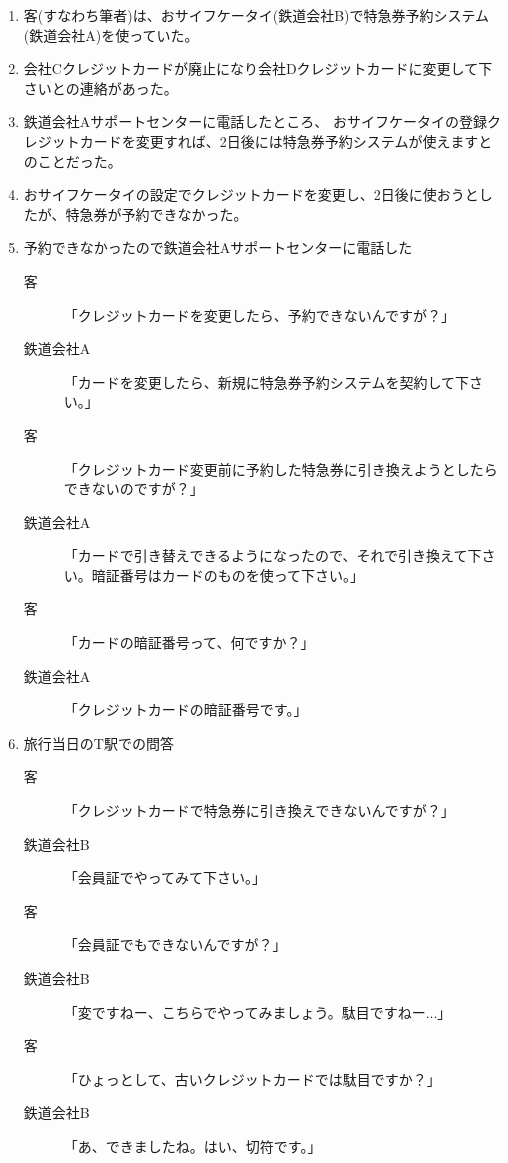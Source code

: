 \begin{enumerate}
\item 客(すなわち筆者)は、おサイフケータイ(鉄道会社B)で特急券予約システム(鉄道会社A)を使っていた。
\item 会社Cクレジットカードが廃止になり会社Dクレジットカードに変更して下さいとの連絡があった。
\item 鉄道会社Aサポートセンターに電話したところ、
	おサイフケータイの登録クレジットカードを変更すれば、2日後には特急券予約システムが使えますとのことだった。
\item おサイフケータイの設定でクレジットカードを変更し、2日後に使おうとしたが、特急券が予約できなかった。

\item 予約できなかったので鉄道会社Aサポートセンターに電話した

	\begin{description}
	\item [客]「クレジットカードを変更したら、予約できないんですが？」
	\item [鉄道会社A]「カードを変更したら、新規に特急券予約システムを契約して下さい。」
	\item [客]「クレジットカード変更前に予約した特急券に引き換えようとしたらできないのですが？」
	\item [鉄道会社A]「カードで引き替えできるようになったので、それで引き換えて下さい。暗証番号はカードのものを使って下さい。」
	\item [客]「カードの暗証番号って、何ですか？」
	\item [鉄道会社A]「クレジットカードの暗証番号です。」
	\end{description}

\item 旅行当日のT駅での問答

	\begin{description}
	\item [客]「クレジットカードで特急券に引き換えできないんですが？」
	\item [鉄道会社B]「会員証でやってみて下さい。」
	\item [客]「会員証でもできないんですが？」
	\item [鉄道会社B]「変ですねー、こちらでやってみましょう。駄目ですねー...」
	\item [客]「ひょっとして、古いクレジットカードでは駄目ですか？」
	\item [鉄道会社B]「あ、できましたね。はい、切符です。」
	\end{description}
\end{enumerate}

